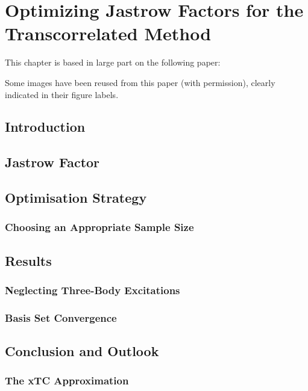 \chapter{Optimizing Jastrow Factors for the Transcorrelated Method}
  \label{chap:opt}

This chapter is based in large part on the following paper:\\

Some images have been reused from this paper (with permission), clearly indicated in their figure labels.

\section{Introduction}

\section{Jastrow Factor}

\section{Optimisation Strategy}

\subsection{Choosing an Appropriate Sample Size}

\section{Results}

\subsection{Neglecting Three-Body Excitations}

\subsection{Basis Set Convergence}

\section{Conclusion and Outlook}
\subsection{The xTC Approximation}
